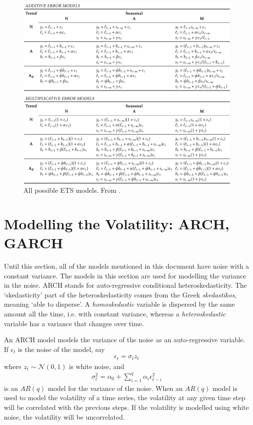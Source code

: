 \documentclass[a4paper,12pt]{article}
\theoremstyle{definition}
\begin{document}
\begin{figure}[ht]
	\centering
	\includegraphics[width=\textwidth]{figures/ets_models.png}
	\caption{All possible ETS models. From \cite{fpp}.}
	\label{fig:ets_models}
\end{figure}

\section{Modelling the Volatility: ARCH, GARCH}
Until this section, all of the models mentioned in this document have noise with a constant variance. The models in this section are used for modelling the variance in the noise. ARCH stands for auto-regressive conditional heteroskedasticity. The `skedasticity' part of the heteroskedasticity comes from the Greek \textit{skedastikos}, meaning `able to disperse'. A \textit{homoskedastic} variable is dispersed by the same amount all the time, i.e. with constant variance, whereas a \textit{heteroskedastic} variable has a variance that changes over time. 

An ARCH model models the variance of the noise as an auto-regressive variable. If $\epsilon_t$ is the noise of the model, say
\begin{align}
	\epsilon_t = \sigma_t z_t
\end{align}
where $z_t \sim \mathcal{N}(0,1)$ is white noise, and 
\begin{align}
	\sigma^2_t = \alpha_0 + \sum_{i=1}^q \alpha_i \epsilon_{t-i}^2
\end{align}
is an $AR(q)$ model for the variance of the noise. When an $AR(q)$ model is used to model the volatility of a time series, the volatility at any given time step will be correlated with the previous steps. If the volatility is modelled using white noise, the volatility will be uncorrelated.
\end{document}
